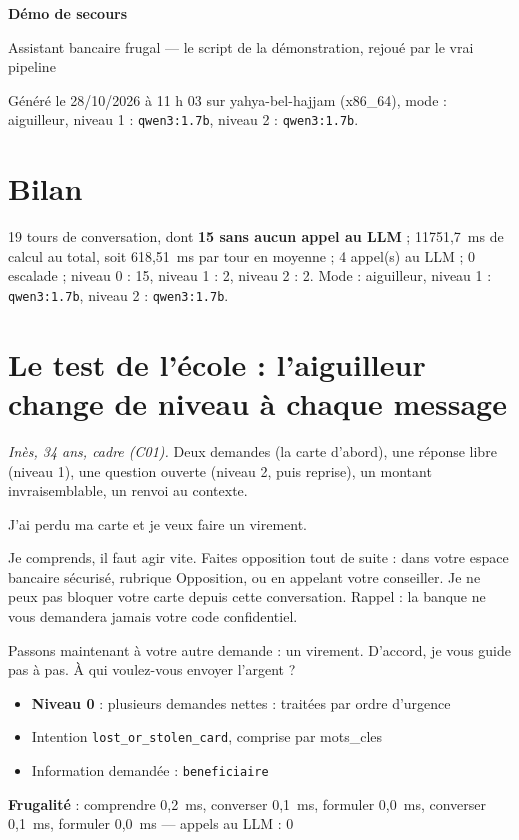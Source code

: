 \documentclass[11pt,a4paper]{article}
\newcommand{\frugal}[1]{{\scriptsize\color{darkgray}\textbf{Frugalité} : #1}\par\medskip}
\begin{document}
{\LARGE\bfseries\color{mainblue} Démo de secours\par}
{\large Assistant bancaire frugal --- le script de la démonstration, rejoué par le vrai pipeline\par}
{\small\color{darkgray} Généré le 28/10/2026 à 11 h 03 sur yahya-bel-hajjam (x86\_64), mode : aiguilleur, niveau 1 : \texttt{qwen3:1.7b}, niveau 2 : \texttt{qwen3:1.7b}.\par}
\medskip
\section*{Bilan}
19 tours de conversation, dont \textbf{15 sans aucun appel au LLM} ; 11751,7~ms de calcul au total, soit 618,51~ms par tour en moyenne ; 4 appel(s) au LLM ; 0 escalade ; niveau 0 : 15, niveau 1 : 2, niveau 2 : 2. Mode : aiguilleur, niveau 1 : \texttt{qwen3:1.7b}, niveau 2 : \texttt{qwen3:1.7b}.
\section{Le test de l'école : l'aiguilleur change de niveau à chaque message}
\textit{Inès, 34 ans, cadre (C01).} Deux demandes (la carte d'abord), une réponse libre (niveau 1), une question ouverte (niveau 2, puis reprise), un montant invraisemblable, un renvoi au contexte.

\begin{client}J'ai perdu ma carte et je veux faire un virement.\end{client}
\begin{assistant}Je comprends, il faut agir vite. Faites opposition tout de suite : dans votre espace bancaire sécurisé, rubrique Opposition, ou en appelant votre conseiller. Je ne peux pas bloquer votre carte depuis cette conversation. Rappel : la banque ne vous demandera jamais votre code confidentiel.\par Passons maintenant à votre autre demande : un virement. D'accord, je vous guide pas à pas. À qui voulez-vous envoyer l'argent ?\end{assistant}
\begin{pourquoi}
\begin{itemize}
\item \textbf{Niveau 0} : plusieurs demandes nettes : traitées par ordre d'urgence
\item Intention \texttt{lost\_or\_stolen\_card}, comprise par mots\_cles
\item Information demandée : \texttt{beneficiaire}
\end{itemize}
\end{pourquoi}
\frugal{comprendre 0,2~ms, converser 0,1~ms, formuler 0,0~ms, converser 0,1~ms, formuler 0,0~ms --- appels au LLM : 0}
\end{document}
